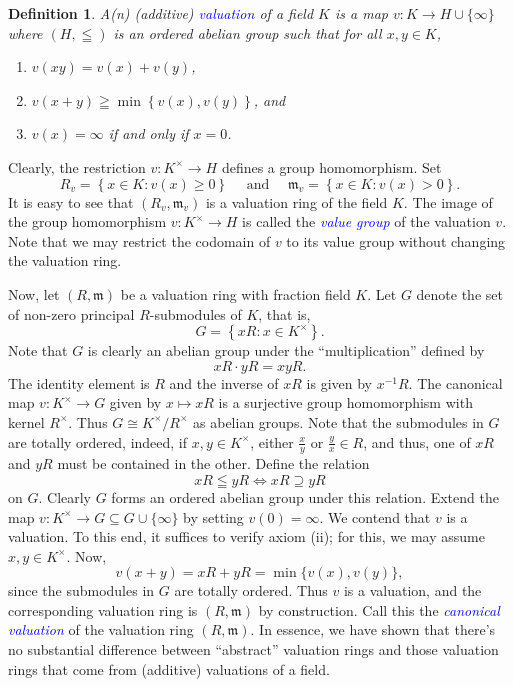 \documentclass[11pt]{article}
\theoremstyle{thmstyle}
\theoremstyle{defstyle}
\newtheorem{definition}[theorem]{Definition}
\newcommand{\frakm}{\mathfrak{m}} %
\newcommand{\define}[1]{\textcolor{blue}{\textit{#1}}}
\renewcommand{\ge}{\geqslant}
\begin{document}
\begin{definition}
    A(n) (additive) \define{valuation} of a field $K$ is a map $v\colon K\to H\cup\{\infty\}$ where $(H, \leqq)$ is an ordered abelian group such that for all $x,y\in K$, 
    \begin{enumerate}[label=(\roman*)]
        \item $v(xy) = v(x) + v(y)$,
        \item $v(x + y)\geqq\min\left\{v(x), v(y)\right\}$, and 
        \item $v(x) = \infty$ if and only if $x = 0$.
    \end{enumerate}
\end{definition}
Clearly, the restriction $v\colon K^\times\to H$ defines a group homomorphism. Set 
\begin{equation*}
    R_v = \left\{x\in K\colon v(x)\ge 0\right\}\quad\text{ and }\quad \frakm_v = \left\{x\in K\colon v(x) > 0\right\}.
\end{equation*}
It is easy to see that $(R_v, \frakm_v)$ is a valuation ring of the field $K$. The image of the group homomorphism $v\colon K^\times\to H$ is called the \define{value group} of the valuation $v$. Note that we may restrict the codomain of $v$ to its value group without changing the valuation ring. 

Now, let $(R,\frakm)$ be a valuation ring with fraction field $K$. Let $G$ denote the set of non-zero principal $R$-submodules of $K$, that is, 
\begin{equation*}
    G = \left\{xR\colon x\in K^\times\right\}.
\end{equation*}
Note that $G$ is clearly an abelian group under the ``multiplication'' defined by 
\begin{equation*}
    xR\cdot yR = xy R.
\end{equation*}
The identity element is $R$ and the inverse of $xR$ is given by $x^{-1}R$. The canonical map $v\colon K^\times\to G$ given by $x\mapsto xR$ is a surjective group homomorphism with kernel $R^\times$. Thus $G\cong K^\times/R^\times$ as abelian groups. Note that the submodules in $G$ are totally ordered, indeed, if $x, y\in K^\times$, either $\frac{x}{y}$ or $\frac{y}{x}\in R$, and thus, one of $xR$ and $yR$ must be contained in the other. Define the relation 
\begin{equation*}
    xR\leqq yR\iff xR\supseteq yR
\end{equation*}
on $G$. Clearly $G$ forms an ordered abelian group under this relation. Extend the map $v\colon K^\times\to G\subseteq G\cup\{\infty\}$ by setting $v(0) = \infty$. We contend that $v$ is a valuation. To this end, it suffices to verify axiom (ii); for this, we may assume $x, y\in K^\times$. Now, 
\begin{equation*}
    v(x + y) = xR + yR = \min\{v(x), v(y)\},
\end{equation*}
since the submodules in $G$ are totally ordered. Thus $v$ is a valuation, and the corresponding valuation ring is $(R, \frakm)$ by construction. Call this the \define{canonical valuation} of the valuation ring $(R,\frakm)$. In essence, we have shown that there's no substantial difference between ``abstract'' valuation rings and those valuation rings that come from (additive) valuations of a field.
\end{document}
